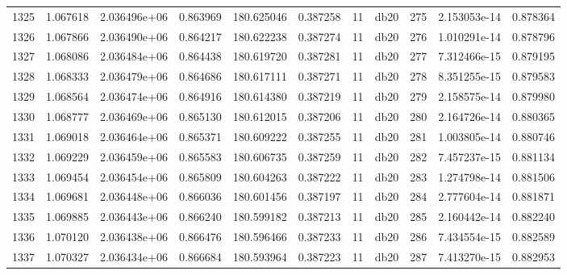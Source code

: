 \begin{tabular}{lrrrrrrlrrr}
1325 &    1.067618 &        2.036496e+06 &  0.863969 &              180.625046 &    0.387258 &      11 &         db20 &    275 &   2.153053e-14 &      0.878364 \\
1326 &    1.067866 &        2.036490e+06 &  0.864217 &              180.622238 &    0.387274 &      11 &         db20 &    276 &   1.010291e-14 &      0.878796 \\
1327 &    1.068086 &        2.036484e+06 &  0.864438 &              180.619720 &    0.387281 &      11 &         db20 &    277 &   7.312466e-15 &      0.879195 \\
1328 &    1.068333 &        2.036479e+06 &  0.864686 &              180.617111 &    0.387271 &      11 &         db20 &    278 &   8.351255e-15 &      0.879583 \\
1329 &    1.068564 &        2.036474e+06 &  0.864916 &              180.614380 &    0.387219 &      11 &         db20 &    279 &   2.158575e-14 &      0.879980 \\
1330 &    1.068777 &        2.036469e+06 &  0.865130 &              180.612015 &    0.387206 &      11 &         db20 &    280 &   2.164726e-14 &      0.880365 \\
1331 &    1.069018 &        2.036464e+06 &  0.865371 &              180.609222 &    0.387255 &      11 &         db20 &    281 &   1.003805e-14 &      0.880746 \\
1332 &    1.069229 &        2.036459e+06 &  0.865583 &              180.606735 &    0.387259 &      11 &         db20 &    282 &   7.457237e-15 &      0.881134 \\
1333 &    1.069454 &        2.036454e+06 &  0.865809 &              180.604263 &    0.387222 &      11 &         db20 &    283 &   1.274798e-14 &      0.881506 \\
1334 &    1.069681 &        2.036448e+06 &  0.866036 &              180.601456 &    0.387197 &      11 &         db20 &    284 &   2.777604e-14 &      0.881871 \\
1335 &    1.069885 &        2.036443e+06 &  0.866240 &              180.599182 &    0.387213 &      11 &         db20 &    285 &   2.160442e-14 &      0.882240 \\
1336 &    1.070120 &        2.036438e+06 &  0.866476 &              180.596466 &    0.387233 &      11 &         db20 &    286 &   7.434554e-15 &      0.882589 \\
1337 &    1.070327 &        2.036434e+06 &  0.866684 &              180.593964 &    0.387223 &      11 &         db20 &    287 &   7.413270e-15 &      0.882953 \\

\end{tabular}
